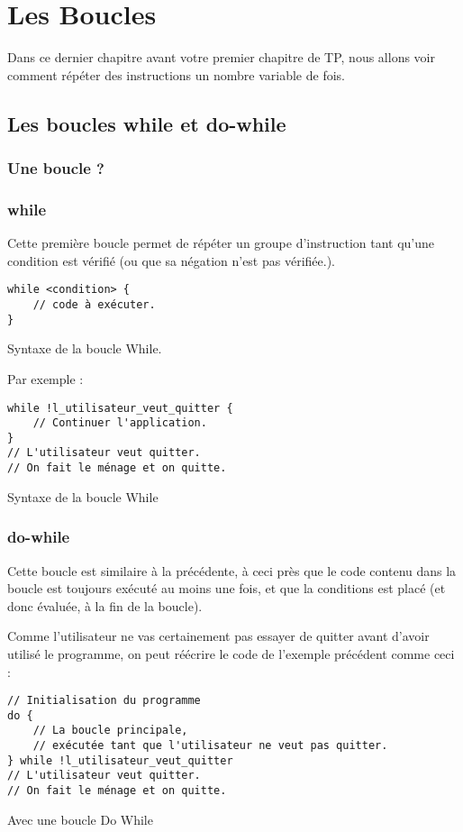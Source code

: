 \chapter{Les Boucles}
Dans ce dernier chapitre avant votre premier chapitre de TP,
nous allons voir comment répéter des instructions un nombre variable de fois.
\section{Les boucles while et do-while}
\subsection{Une boucle ?}

\subsection{while}
Cette première boucle permet de répéter un groupe d'instruction tant qu'une condition est vérifié (ou que sa négation n'est pas vérifiée.).

\begin{listing}[H]
\begin{verbatim}
while <condition> {
    // code à exécuter.
}
\end{verbatim}
\caption{Syntaxe de la boucle While.}
\end{listing}

Par exemple :
\begin{listing}[h]
\begin{verbatim}
while !l_utilisateur_veut_quitter {
    // Continuer l'application.
}
// L'utilisateur veut quitter.
// On fait le ménage et on quitte.
\end{verbatim}
\caption{Syntaxe de la boucle While}
\end{listing}
\subsection{do-while}
Cette boucle est similaire à la précédente, à ceci près que le code contenu dans la boucle est toujours exécuté au moins une fois, et que la conditions est placé (et donc évaluée, à la fin de la boucle).

Comme l'utilisateur ne vas certainement pas essayer de quitter avant d'avoir utilisé le programme, on peut réécrire le code de l'exemple précédent comme ceci :
\begin{listing}[H]
\begin{verbatim}
// Initialisation du programme
do {
    // La boucle principale,
    // exécutée tant que l'utilisateur ne veut pas quitter.
} while !l_utilisateur_veut_quitter
// L'utilisateur veut quitter.
// On fait le ménage et on quitte.
\end{verbatim}
\caption{Avec une boucle Do While}
\end{listing}

